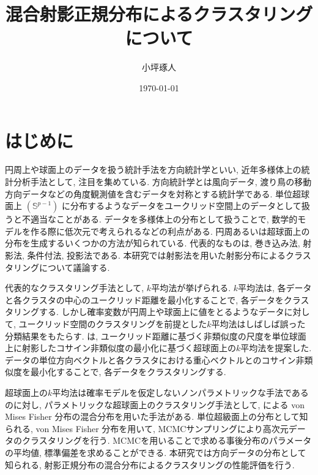 \documentclass[a4paper,11pt]{jarticle}
\title{混合射影正規分布によるクラスタリングについて}   %
\author{小坪琢人}   %
\date{\today}   %
\begin{document}
%


\maketitle   %
\setlength{\baselineskip}{20pt}   %
\tableofcontents   %
\listoffigures   %
\listoftables   %
\clearpage   %


\section{はじめに}

円周上や球面上のデータを扱う統計手法を方向統計学といい, 近年多様体上の統計分析手法として, 注目を集めている. 方向統計学とは風向データ, 渡り鳥の移動方向データなどの角度観測値を含むデータを対称とする統計学である. 単位超球面上 $(\mathbb{S}^{p-1})$ に分布するようなデータをユークリッド空間上のデータとして扱うと不適当なことがある. データを多様体上の分布として扱うことで, 数学的モデルを作る際に低次元で考えられるなどの利点がある. 円周あるいは超球面上の分布を生成するいくつかの方法が知られている. 代表的なものは, 巻き込み法, 射影法, 条件付法, 投影法である. 本研究では射影法を用いた射影分布によるクラスタリングについて議論する.

代表的なクラスタリング手法として, $k$平均法が挙げられる. $k$平均法は, 各データと各クラスタの中心のユークリッド距離を最小化することで, 各データをクラスタリングする. しかし確率変数が円周上や球面上に値をとるようなデータに対して, ユークリッド空間のクラスタリングを前提とした$k$平均法はしばしば誤った分類結果をもたらす. \citet{SKMcluster}は, ユークリッド距離に基づく非類似度の尺度を単位球面上に射影したコサイン非類似度の最小化に基づく超球面上の$k$平均法を提案した. データの単位方向ベクトルと各クラスタにおける重心ベクトルとのコサイン非類似度を最小化することで, 各データをクラスタリングする. 

超球面上の$k$平均法は確率モデルを仮定しないノンパラメトリックな手法であるのに対し,  パラメトリックな超球面上のクラスタリング手法として, \citet{Gopal}による von Mises Fisher 分布の混合分布を用いた手法がある. 単位超級面上の分布として知られる, von Mises Fisher 分布を用いて, MCMCサンプリングにより高次元データのクラスタリングを行う. MCMCを用いることで求める事後分布のパラメータの平均値, 標準偏差を求めることができる. 本研究では方向データの分布として知られる, 射影正規分布の混合分布によるクラスタリングの性能評価を行う. 
\end{document}
